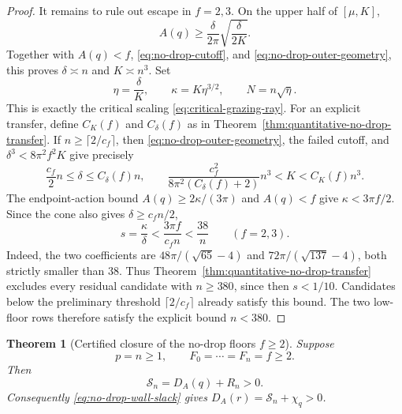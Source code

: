 \documentclass[11pt]{article}
\newtheorem{theorem}{Theorem}[section]
\theoremstyle{remark}
\begin{document}
\begin{proof}
It remains to rule out escape in $f=2,3$.  On the upper half of
$[\mu,K]$,
\[
 A(q)\geq\frac\delta{2\pi}\sqrt{\frac\delta{2K}}.
\]
Together with $A(q)<f$, \eqref{eq:no-drop-cutoff}, and
\eqref{eq:no-drop-outer-geometry}, this proves
$\delta\asymp n$ and $K\asymp n^3$.  Set
\[
 \eta=\frac\delta K,\qquad
 \kappa=K\eta^{3/2},\qquad N=n\sqrt\eta.
\]
This is exactly the critical scaling \eqref{eq:critical-grazing-ray}.
For an explicit transfer, define $C_K(f)$ and $C_\delta(f)$ as in
Theorem~\ref{thm:quantitative-no-drop-transfer}.  If
$n\geq\lceil2/c_f\rceil$, then
\eqref{eq:no-drop-outer-geometry}, the failed cutoff, and
$\delta^3<8\pi^2f^2K$ give precisely
\[
 \frac{c_f}{2}n\leq\delta\leq C_\delta(f)n,\qquad
 \frac{c_f^2}{8\pi^2(C_\delta(f)+2)}n^3
 <K<C_K(f)n^3.
\]
The endpoint-action bound $A(q)\geq2\kappa/(3\pi)$ and $A(q)<f$ give
$\kappa<3\pi f/2$.  Since the cone also gives
$\delta\geq c_fn/2$,
\begin{equation}
 s=\frac\kappa\delta<\frac{3\pi f}{c_fn}<\frac{38}{n}
 \qquad(f=2,3).
 \label{eq:no-drop-round-five-s-bound}
\end{equation}
Indeed, the two coefficients are
$48\pi/(\sqrt{65}-4)$ and $72\pi/(\sqrt{137}-4)$, both strictly smaller
than $38$.
Thus Theorem~\ref{thm:quantitative-no-drop-transfer} excludes every
residual candidate with $n\geq380$, since then $s<1/10$.  Candidates below
the preliminary threshold $\lceil2/c_f\rceil$ already satisfy this bound.
The two low-floor rows therefore satisfy the explicit bound $n<380$.
\end{proof}

\begin{theorem}[Certified closure of the no-drop floors $f\geq2$]
\label{thm:no-drop-high-floors-complete}
Suppose
\[
 p=n\geq1,\qquad F_0=\cdots=F_n=f\geq2.
\]
Then
\begin{equation}
 \boxed{\mathcal S_n=D_A(q)+R_n>0.}
 \label{eq:no-drop-high-floors-complete}
\end{equation}
Consequently \eqref{eq:no-drop-wall-slack} gives
$D_A(r)=\mathcal S_n+\chi_q>0$.
\end{theorem}
\end{document}
